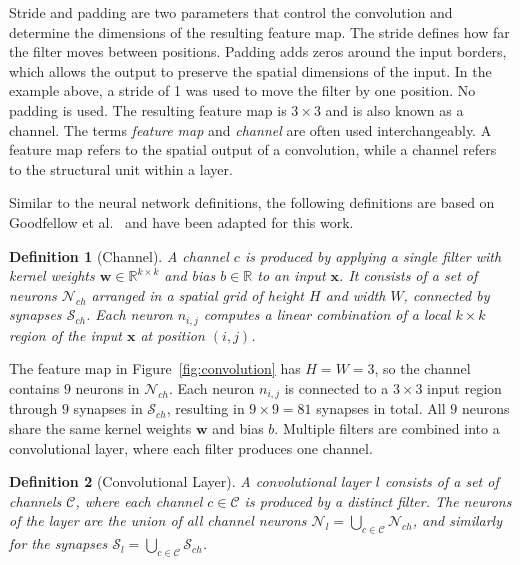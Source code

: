 \documentclass[
12pt,
fancyheadings,
a4paper,
twoside,
BCOR=0.7cm,
nobcorignoretitle,
grayscalebody,
]{stsreprt}
\newtheorem{definition}{Definition}[chapter]
\begin{document}
Stride and padding are two parameters that control the convolution and determine the dimensions of
the resulting feature map.
The stride defines how far the filter moves between positions.
Padding adds zeros around the input borders, which allows the output to preserve the spatial
dimensions of the input.
In the example above, a stride of 1 was used to move the filter by one position. No padding is
used.
The resulting feature map is $3 \times 3$ and is also known as a channel.
The terms \textit{feature map} and \textit{channel} are often used interchangeably. A feature map
refers to the spatial output of a convolution, while a channel refers to the structural unit within
a layer.

Similar to the neural network definitions, the following definitions are based on Goodfellow et
al.~\cite{Goodfellow-et-al-2016} and have been adapted for this work.

\begin{definition}[Channel]
\label{def:channel}
A channel $c$ is produced by applying a single filter with kernel weights $\mathbf{w} \in
\mathbb{R}^{k \times k}$ and bias $b \in \mathbb{R}$ to an input $\mathbf{x}$.
It consists of a set of neurons $\mathcal{N}_{ch}$ arranged in a spatial grid of height $H$ and
width $W$, connected by synapses $\mathcal{S}_{ch}$.
Each neuron $n_{i,j}$ computes a linear combination of a local $k \times k$ region of the input
$\mathbf{x}$ at position $(i, j)$.
\end{definition}

The feature map in Figure~\ref{fig:convolution} has $H = W = 3$, so the channel contains $9$
neurons in $\mathcal{N}_{ch}$.
Each neuron $n_{i,j}$ is connected to a $3 \times 3$ input region through $9$ synapses in
$\mathcal{S}_{ch}$, resulting in $9 \times 9 = 81$ synapses in total.
All $9$ neurons share the same kernel weights $\mathbf{w}$ and bias $b$.
Multiple filters are combined into a convolutional layer, where each filter produces one channel.

\begin{definition}[Convolutional Layer]
\label{def:conv_layer}
A convolutional layer $l$ consists of a set of channels $\mathcal{C}$, where each channel $c \in
\mathcal{C}$ is produced by a distinct filter.
The neurons of the layer are the union of all channel neurons $\mathcal{N}_l = \bigcup_{c \in
\mathcal{C}} \mathcal{N}_{ch}$, and similarly for the synapses $\mathcal{S}_l = \bigcup_{c \in
\mathcal{C}} \mathcal{S}_{ch}$.
\end{definition}
\end{document}
